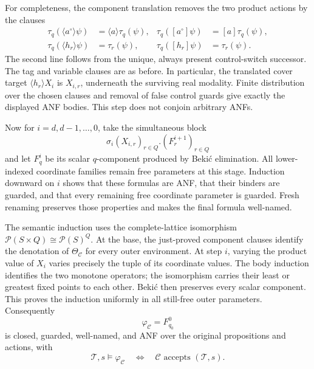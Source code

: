 For completeness, the component
translation removes the two
product actions by the clauses
\[
\begin{aligned}
 \tau_q(\langle a^\circ\rangle\psi)
       &=\langle a\rangle\tau_q(\psi),&
 \tau_q([a^\circ]\psi)
       &=[a]\tau_q(\psi),\\
 \tau_q(\langle h_r\rangle\psi)
       &=\tau_r(\psi),&
 \tau_q([h_r]\psi)
       &=\tau_r(\psi).
\end{aligned}
\]
The second line follows from
the unique, always present
control-switch successor.
The tag and variable clauses
are as before. In particular,
the translated cover target
\(\langle h_r\rangle X_i\)
is \(X_{i,r}\), underneath
the surviving real modality.
Finite distribution over the
chosen clauses and removal
of false control guards
give exactly the displayed
ANF bodies. This step does
not conjoin arbitrary ANFs.

Now for \(i=d,d-1,\ldots,0\),
take the simultaneous block
\[
 \sigma_i(X_{i,r})_{r\in Q}.
                      (F_r^{i+1})_{r\in Q}
\]
and let \(F_q^i\) be its
scalar \(q\)-component produced
by Beki\'c elimination.
All lower-indexed coordinate
families remain free parameters
at this stage.
Induction downward on \(i\)
shows that these formulas
are ANF, that their binders
are guarded, and that every
remaining free coordinate
parameter is guarded.
Fresh renaming preserves those
properties and makes the
final formula well-named.

The semantic induction uses
the complete-lattice isomorphism
\(\mathcal P(S\times Q)\cong\mathcal P(S)^Q\).
At the base, the just-proved
component clauses identify
the denotation of
\(\Theta_{\mathcal C}\) for
every outer environment.
At step \(i\), varying the
product value of \(X_i\)
varies precisely the tuple
of its coordinate values.
The body induction identifies
the two monotone operators;
the isomorphism carries their
least or greatest fixed points
to each other. Beki\'c then
preserves every scalar component.
This proves the induction
uniformly in all still-free
outer parameters.
Consequently
\[
 \varphi_{\mathcal C}=F_{q_0}^{0}
\]
is closed, guarded, well-named,
and ANF over the original
propositions and actions, with
\[
 \mathcal T,s\models\varphi_{\mathcal C}
 \quad\Longleftrightarrow\quad
 \mathcal C\text{ accepts }(\mathcal T,s).
\]

